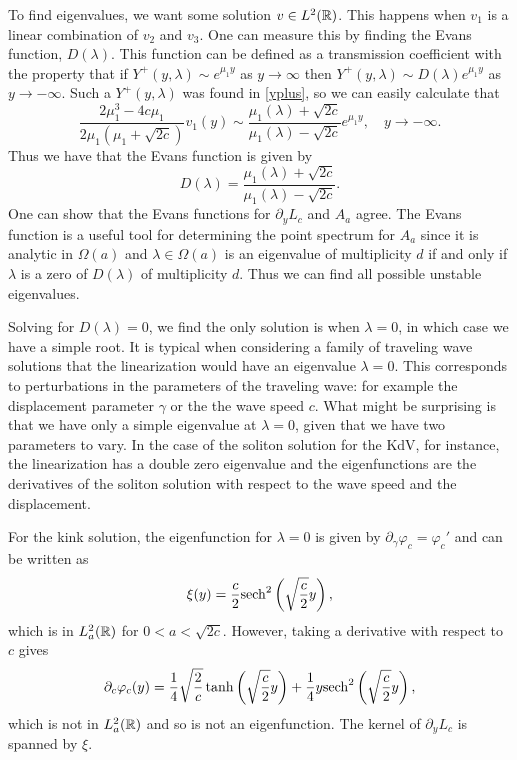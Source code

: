 To find eigenvalues, we want some solution \(v\in L^2(\mathbb{R})\). This happens when \(v_1\) is a linear combination of \(v_2\) and \(v_3\). One can measure this by finding the Evans function, \(D(\lambda)\). This function can be defined as a transmission coefficient with the property that if \(Y^+(y,\lambda)\sim e^{\mu_1 y}\) as \(y\to \infty\) then \(Y^+(y,\lambda) \sim D(\lambda) e^{\mu_1 y}\) as \(y\to-\infty\). Such a \(Y^+(y,\lambda)\) was found in \cref{yplus}, so we can easily calculate that
\begin{equation}
	\frac{2\mu_1^3 - 4c\mu_1}{2\mu_1(\mu_1 + \sqrt{2c})} v_1(y) \sim \frac{\mu_1(\lambda) + \sqrt{2c}}{\mu_1(\lambda) - \sqrt{2c}} e^{\mu_1 y}, \quad y\to-\infty.
\end{equation}
Thus we have that the Evans function is given by
\begin{equation}
	D(\lambda ) = \frac{\mu_1(\lambda) + \sqrt{2c}}{\mu_1(\lambda) - \sqrt{2c}}.
\end{equation}
One can show that the Evans functions for \(\partial_y L_c\) and \(A_a\) agree. The Evans function is a useful tool for determining the point spectrum for \(A_a\) since it is analytic in \(\Omega(a)\) and \(\lambda \in \Omega(a)\) is an eigenvalue of multiplicity \(d\) if and only if \(\lambda\) is a zero of \(D(\lambda)\) of multiplicity \(d\). Thus we can find all possible unstable eigenvalues.

Solving for \(D(\lambda) = 0\), we find the only solution is when \(\lambda = 0\), in which case we have a simple root. It is typical when considering a family of traveling wave solutions that the linearization would have an eigenvalue \(\lambda = 0\). This corresponds to perturbations in the parameters of the traveling wave: for example the displacement parameter \(\gamma\) or the the wave speed \(c\). What might be surprising is that we have only a simple eigenvalue at \(\lambda = 0\), given that we have two parameters to vary. In the case of the soliton solution for the KdV, for instance, the linearization has a double zero eigenvalue and the eigenfunctions are the derivatives of the soliton solution with respect to the wave speed and the displacement.

For the kink solution, the eigenfunction for \(\lambda = 0\) is given by \(\partial_\gamma \varphi_c = \varphi_c'\) and can be written as 
\begin{equation}
	\xi(y) = \frac c 2 \mathrm{sech}^2\left( \sqrt{\frac c 2} y \right),
\end{equation}
which is in \(L^2_a(\mathbb{R})\) for \(0 < a < \sqrt {2c}\). However, taking a derivative with respect to \(c\) gives
\begin{equation}
	\partial_c \varphi_c (y) =  \frac 1 4 \sqrt{\frac 2 c} \tanh\left(\sqrt{\frac c 2} y\right) + \frac 1 4 y \mathrm{sech}^2\left(\sqrt{\frac c 2} y\right),
\end{equation}
which is not in \(L^2_a(\mathbb{R})\) and so is not an eigenfunction. The kernel of \(\partial_y L_c\) is spanned by \(\xi\). 

